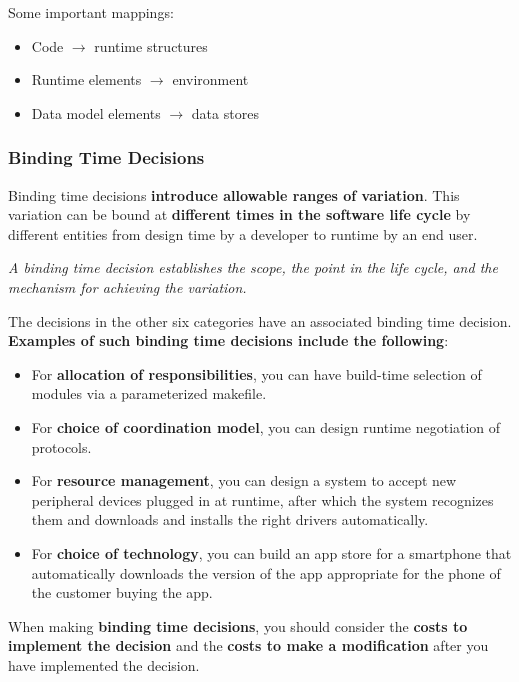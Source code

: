 \documentclass[a4paper]{article}
\begin{document}
Some important mappings: 
\begin{itemize}
\item Code $\rightarrow$ runtime structures
\item Runtime elements $\rightarrow$ environment
\item Data model elements $\rightarrow$ data stores
\end{itemize}

\subsubsection{Binding Time Decisions}
Binding time decisions \textbf{introduce allowable ranges of variation}. This variation can be bound at \textbf{different times in the software life cycle} by different entities from design time by a developer to runtime by an end user. 

\textit{A binding time decision establishes the scope, the point in the life cycle, and the mechanism for achieving the variation.}

The decisions in the other six categories have an associated binding time decision. \textbf{Examples of such binding time decisions include the following}:

\begin{itemize}
\item For \textbf{allocation of responsibilities}, you can have build-time selection of modules via a parameterized makefile.

\item For \textbf{choice of coordination model}, you can design runtime negotiation of protocols.

\item For \textbf{resource management}, you can design a system to accept new peripheral devices plugged in at runtime, after which the system recognizes them and downloads and installs the right drivers automatically.

\item For \textbf{choice of technology}, you can build an app store for a smartphone that automatically downloads the version of the app appropriate for the phone of the customer buying the app.\\
\end{itemize}


When making \textbf{binding time decisions}, you should consider the \textbf{costs to implement the decision} and the \textbf{costs to make a modification} after you have implemented the decision. 
\end{document}
